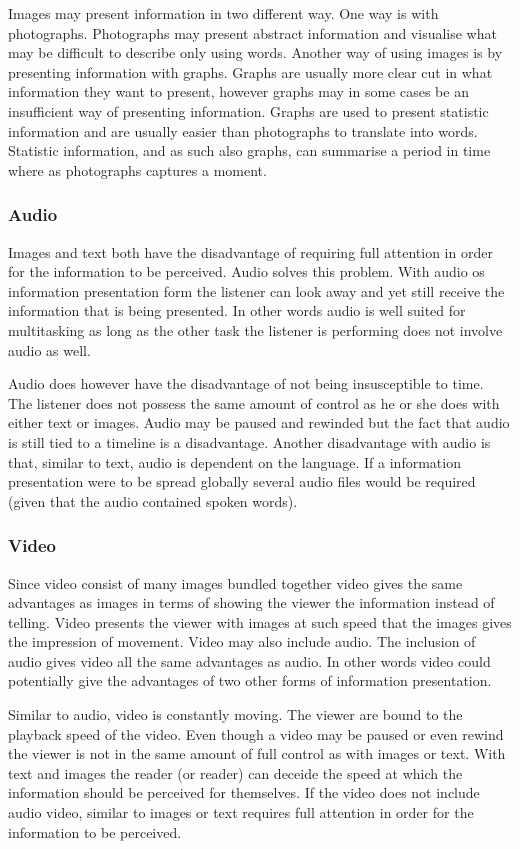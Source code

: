 Images may present information in two different way. One way is with photographs. Photographs may present abstract information and visualise what may be difficult to describe only using words. Another way of using images is by presenting information with graphs. Graphs are usually more clear cut in what information they want to present, however graphs may in some cases be an insufficient way of presenting information. Graphs are used to present statistic information and are usually easier than photographs to translate into words. Statistic information, and as such also graphs, can summarise a period in time where as photographs captures a moment. 

\subsubsection{Audio}
Images and text both have the disadvantage of requiring full attention in order for the information to be perceived. Audio solves this problem. With audio os information presentation form the listener can look away and yet still receive the information that is being presented. In other words audio is well suited for multitasking as long as the other task the listener is performing does not involve audio as well.

Audio does however have the disadvantage of not being insusceptible to time. The listener does not possess the same amount of control as he or she does with either text or images. Audio may be paused and rewinded but the fact that audio is still tied to a timeline is a disadvantage. Another disadvantage with audio is that, similar to text, audio is dependent on the language. If a information presentation were to be spread globally several audio files would be required (given that the audio contained spoken words).

\subsubsection{Video}
Since video consist of many images bundled together video gives the same advantages as images in terms of showing the viewer the information instead of telling. Video presents the viewer with images at such speed that the images gives the impression of movement. Video may also include audio. The inclusion of audio gives video all the same advantages as audio. In other words video could potentially give the advantages of two other forms of information presentation.

Similar to audio, video is constantly moving. The viewer are bound to the playback speed of the video. Even though a video may be paused or even rewind the viewer is not in the same amount of full control as with images or text. With text and images the reader (or reader) can deceide the speed at which the information should be perceived for themselves. If the video does not include audio video, similar to images or text requires full attention in order for the information to be perceived.
